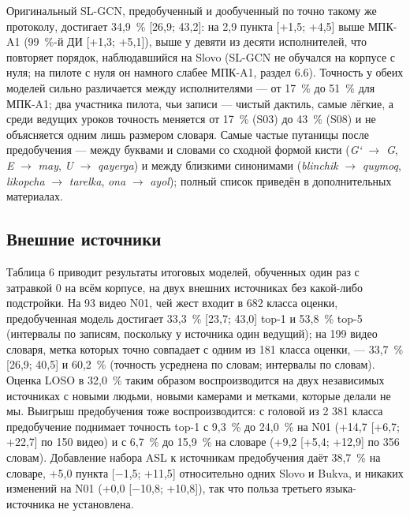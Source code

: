 \documentclass[a4paper,fleqn]{cas-dc}
\begin{document}
Оригинальный SL-GCN, предобученный и дообученный по точно такому же протоколу, достигает 34,9~\% {[}26,9; 43,2{]}: на 2,9 пункта {[}+1,5; +4,5{]} выше МПК-A1 (99~\%-й ДИ {[}+1,3; +5,1{]}), выше у девяти из десяти исполнителей, что повторяет порядок, наблюдавшийся на Slovo (SL-GCN не обучался на корпусе с нуля; на пилоте с нуля он намного слабее МПК-A1, раздел 6.6). Точность у обеих моделей сильно различается между исполнителями --- от 17~\% до 51~\% для МПК-A1; два участника пилота, чьи записи --- чистый дактиль, самые лёгкие, а среди ведущих уроков точность меняется от 17~\% (S03) до 43~\% (S08) и не объясняется одним лишь размером словаря. Самые частые путаницы после предобучения --- между буквами и словами со сходной формой кисти (\emph{G‘} $\rightarrow$ \emph{G}, \emph{E} $\rightarrow$ \emph{may}, \emph{U} $\rightarrow$ \emph{qayerga}) и между близкими синонимами (\emph{blinchik} $\rightarrow$ \emph{quymoq}, \emph{likopcha} $\rightarrow$ \emph{tarelka}, \emph{ona} $\rightarrow$ \emph{ayol}); полный список приведён в дополнительных материалах.

\hypertarget{ux432ux43dux435ux448ux43dux438ux435-ux438ux441ux442ux43eux447ux43dux438ux43aux438-1}{%
\subsection{Внешние источники}\label{ux432ux43dux435ux448ux43dux438ux435-ux438ux441ux442ux43eux447ux43dux438ux43aux438-1}}

Таблица 6 приводит результаты итоговых моделей, обученных один раз с затравкой 0 на всём корпусе, на двух внешних источниках без какой-либо подстройки. На 93 видео N01, чей жест входит в 682 класса оценки, предобученная модель достигает 33,3~\% {[}23,7; 43,0{]} top-1 и 53,8~\% top-5 (интервалы по записям, поскольку у источника один ведущий); на 199 видео словаря, метка которых точно совпадает с одним из 181 класса оценки, --- 33,7~\% {[}26,9; 40,5{]} и 60,2~\% (точность усреднена по словам; интервалы по словам). Оценка LOSO в 32,0~\% таким образом воспроизводится на двух независимых источниках с новыми людьми, новыми камерами и метками, которые делали не мы. Выигрыш предобучения тоже воспроизводится: с головой из 2 381 класса предобучение поднимает точность top-1 с 9,3~\% до 24,0~\% на N01 (+14,7 {[}+6,7; +22,7{]} по 150 видео) и с 6,7~\% до 15,9~\% на словаре (+9,2 {[}+5,4; +12,9{]} по 356 словам). Добавление набора ASL к источникам предобучения даёт 38,7~\% на словаре, +5,0 пункта {[}$-$1,5; +11,5{]} относительно одних Slovo и Bukva, и никаких изменений на N01 (+0,0 {[}$-$10,8; +10,8{]}), так что польза третьего языка-источника не установлена.
\end{document}
